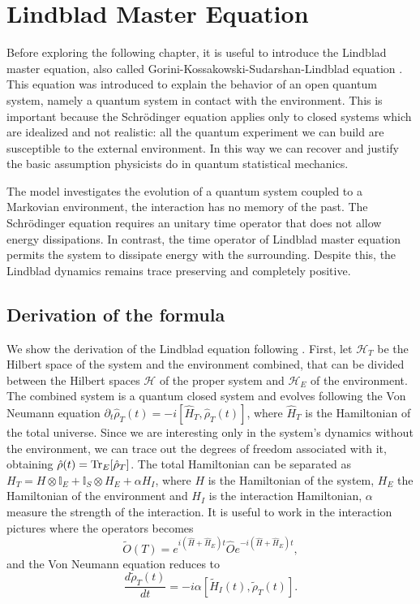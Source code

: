 \chapter{Lindblad Master Equation}\label{C_Lindblad}
Before exploring the following chapter, it is useful to introduce the Lindblad master equation, also called Gorini-Kossakowski-Sudarshan-Lindblad equation \cite{Lindblad,G_K_S}. This equation was introduced to explain the behavior of an open quantum system, namely a quantum system in contact with the environment. This is important because the Schrödinger equation applies only to closed systems which are idealized and not realistic: all the quantum experiment we can build are susceptible to the external environment.
In this way we can recover and justify the basic assumption physicists do in quantum statistical mechanics.

The model investigates the evolution of a quantum system coupled to a Markovian environment, the interaction has no memory of the past.  
The Schrödinger equation requires an unitary time operator that does not allow energy dissipations. In contrast, the time operator of Lindblad master equation permits the system to dissipate energy with the surrounding. 
Despite this, the Lindblad dynamics remains trace preserving and completely positive.

\section{Derivation of the formula}
We show the derivation of the Lindblad equation following \cite{Manzano,Breuer-Petruccione}.
First, let $\mathcal{H}_T$ be the Hilbert space of the system and the environment combined, that can be divided between the Hilbert spaces $\mathcal{H}$ of the proper system and $\mathcal{H}_E$ of the environment. The combined system is a quantum closed system and evolves following the Von Neumann equation $\partial_t\hat\rho_T(t) = -i[\hat H_T,\hat\rho_T(t)]$, where $\hat H_T$ is the Hamiltonian of the total universe.
Since we are interesting only in the system's dynamics without the environment, we can trace out the degrees of freedom associated with it, obtaining $\hat\rho(t) = \operatorname{Tr}_E[\hat\rho_T]$. The total Hamiltonian can be separated as $H_T = H \otimes \mathbb{I}_E + \mathbb{I}_S \otimes H_E + \alpha H_I$, where $H$ is the Hamiltonian of the system, $H_E$ the Hamiltonian of the environment and $H_I$ is the interaction Hamiltonian, $\alpha$  measure the strength of the interaction.
It is useful to work in the interaction pictures where the operators becomes
\begin{equation}
    \tilde O(T) = e^{i(\hat H+\hat H_E)t}\hat O e^{-i(\hat H+\hat H_E)t},
\end{equation}
and the Von Neumann equation reduces to 
\begin{equation}\label{C_interacting_picture}
    \frac{d\tilde\rho_T(t)}{dt}= -i\alpha\left[\tilde H_I(t),\tilde\rho_T(t)\right].
\end{equation}  

